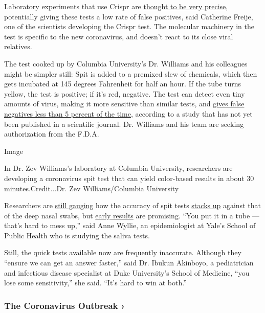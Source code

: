 Laboratory experiments that use Crispr are
\href{https://www.ncbi.nlm.nih.gov/pmc/articles/PMC5915479/}{thought to
be very precise}, potentially giving these tests a low rate of false
positives, said Catherine Freije, one of the scientists developing the
Crispr test. The molecular machinery in the test is specific to the new
coronavirus, and doesn't react to its close viral relatives.

The test cooked up by Columbia University's Dr. Williams and his
colleagues might be simpler still: Spit is added to a premixed slew of
chemicals, which then gets incubated at 145 degrees Fahrenheit for half
an hour. If the tube turns yellow, the test is positive; if it's red,
negative. The test can detect even tiny amounts of virus, making it more
sensitive than similar tests, and
\href{https://www.medrxiv.org/content/10.1101/2020.06.13.20129841v1.full.pdf}{gives
false negatives less than 5 percent of the time}, according to a study
that has not yet been published in a scientific journal. Dr. Williams
and his team are seeking authorization from the F.D.A.

Image

In Dr. Zev Williams's laboratory at Columbia University, researchers are
developing a coronavirus spit test that can yield color-based results in
about 30 minutes.Credit...Dr. Zev Williams/Columbia University

Researchers are
\href{https://jamanetwork.com/journals/jama/fullarticle/2765837}{still
gauging} how the accuracy of spit tests
\href{https://pubmed.ncbi.nlm.nih.gov/32310815/}{stacks up} against that
of the deep nasal swabs, but
\href{https://www.medrxiv.org/content/10.1101/2020.04.16.20067835v1.full.pdf}{early
results} are promising. ``You put it in a tube --- that's hard to mess
up,'' said Anne Wyllie, an epidemiologist at Yale's School of Public
Health who is studying the saliva tests.

Still, the quick tests available now are frequently inaccurate. Although
they ``ensure we can get an answer faster,'' said Dr. Ibukun Akinboyo, a
pediatrician and infectious disease specialist at Duke University's
School of Medicine, ``you lose some sensitivity,'' she said. ``It's hard
to win at both.''

\href{https://www.nytimes3xbfgragh.onion/news-event/coronavirus?action=click\&pgtype=Article\&state=default\&region=MAIN_CONTENT_3\&context=storylines_faq}{}

\hypertarget{the-coronavirus-outbreak-}{%
\subsubsection{The Coronavirus Outbreak
›}\label{the-coronavirus-outbreak-}}

